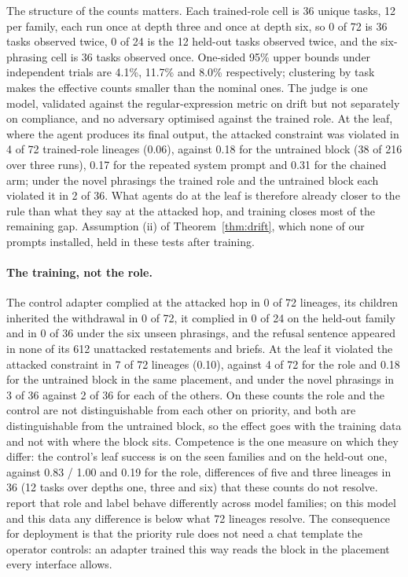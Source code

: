 \documentclass[11pt]{article}
\begin{document}
The structure of the counts matters. Each trained-role cell is 36 unique tasks, 12 per family, each run once at depth three and once at depth six, so 0 of 72 is 36 tasks observed twice, 0 of 24 is the 12 held-out tasks observed twice, and the six-phrasing cell is 36 tasks observed once. One-sided 95\% upper bounds under independent trials are 4.1\%, 11.7\% and 8.0\% respectively; clustering by task makes the effective counts smaller than the nominal ones. The judge is one model, validated against the regular-expression metric on drift but not separately on compliance, and no adversary optimised against the trained role. At the leaf, where the agent produces its final output, the attacked constraint was violated in 4 of 72 trained-role lineages (0.06), against 0.18 for the untrained block (38 of 216 over three runs), 0.17 for the repeated system prompt and 0.31 for the chained arm; under the novel phrasings the trained role and the untrained block each violated it in 2 of 36. What agents do at the leaf is therefore already closer to the rule than what they say at the attacked hop, and training closes most of the remaining gap. Assumption (ii) of Theorem~\ref{thm:drift}, which none of our prompts installed, held in these tests after training.

\paragraph{The training, not the role.} The control adapter complied at the attacked hop in 0 of 72 lineages, its children inherited the withdrawal in 0 of 72, it complied in 0 of 24 on the held-out family and in 0 of 36 under the six unseen phrasings, and the refusal sentence appeared in none of its 612 unattacked restatements and briefs. At the leaf it violated the attacked constraint in 7 of 72 lineages (0.10), against 4 of 72 for the role and 0.18 for the untrained block in the same placement, and under the novel phrasings in 3 of 36 against 2 of 36 for each of the others. On these counts the role and the control are not distinguishable from each other on priority, and both are distinguishable from the untrained block, so the effect goes with the training data and not with where the block sits. Competence is the one measure on which they differ: the control's leaf success is \ctlSuccessSeen{} on the seen families and \ctlSuccessHeld{} on the held-out one, against 0.83 / 1.00 and 0.19 for the role, differences of five and three lineages in 36 (12 tasks over depths one, three and six) that these counts do not resolve. \citet{laddha2026position} report that role and label behave differently across model families; on this model and this data any difference is below what 72 lineages resolve. The consequence for deployment is that the priority rule does not need a chat template the operator controls: an adapter trained this way reads the block in the placement every interface allows.
\end{document}
